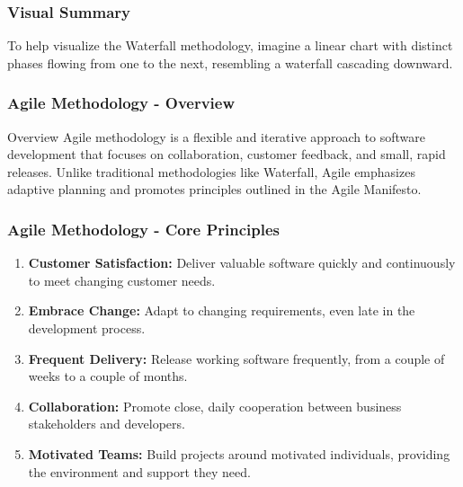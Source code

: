 \documentclass{beamer}
\begin{document}
\begin{frame}[fragile]
    \frametitle{Visual Summary}
    To help visualize the Waterfall methodology, imagine a linear chart with distinct phases flowing from one to the next, resembling a waterfall cascading downward.
\end{frame}

\begin{frame}[fragile]
    \frametitle{Agile Methodology - Overview}
    \begin{block}{Overview}
        Agile methodology is a flexible and iterative approach to software development that focuses on collaboration, customer feedback, and small, rapid releases. Unlike traditional methodologies like Waterfall, Agile emphasizes adaptive planning and promotes principles outlined in the Agile Manifesto.
    \end{block}
\end{frame}

\begin{frame}[fragile]
    \frametitle{Agile Methodology - Core Principles}
    \begin{enumerate}
        \item \textbf{Customer Satisfaction:} Deliver valuable software quickly and continuously to meet changing customer needs.
        \item \textbf{Embrace Change:} Adapt to changing requirements, even late in the development process.
        \item \textbf{Frequent Delivery:} Release working software frequently, from a couple of weeks to a couple of months.
        \item \textbf{Collaboration:} Promote close, daily cooperation between business stakeholders and developers.
        \item \textbf{Motivated Teams:} Build projects around motivated individuals, providing the environment and support they need.
    \end{enumerate}
\end{frame}
\end{document}
